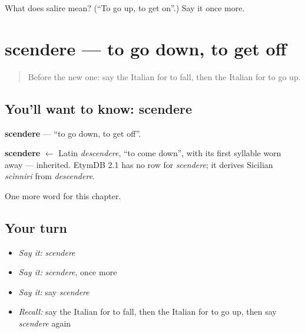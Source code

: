 \begin{tcolorbox}[breakable,colback=teal!4,colframe=teal!35!black,title={Before you move on}]
What does salire mean? (\textquotedblleft{}To go up, to get on\textquotedblright{}.) Say it once more.
\end{tcolorbox}
\section[scendere]{scendere — to go down, to get off}

\label{lesson:IT-C135-scendere}



\begin{quote}
Before the new one: say the Italian for to fall, then the Italian for to go up.
\end{quote}

\subsection*{You'll want to know: scendere}
\textbf{scendere} — \textquotedblleft{}to go down, to get off\textquotedblright{}.

\begin{cousinweb}
\textbf{scendere} $\leftarrow$ Latin \emph{descendere}, \textquotedblleft{}to come down\textquotedblright{}, with its first syllable worn away — inherited. EtymDB 2.1 has no row for \emph{scendere}; it derives Sicilian \emph{scìnniri} from \emph{descendere}.
\end{cousinweb}

\begin{grammarlens}[title={What you've built}]
One more word for this chapter.
\end{grammarlens}

\subsection*{Your turn}
\begin{itemize}
\raggedright
  \item \emph{Say it:} \emph{scendere}
  \item \emph{Say it:} \emph{scendere}, once more
  \item \emph{Say it:} say \emph{scendere}
  \item \emph{Recall:} say the Italian for to fall, then the Italian for to go up, then say \emph{scendere} again
\end{itemize}


